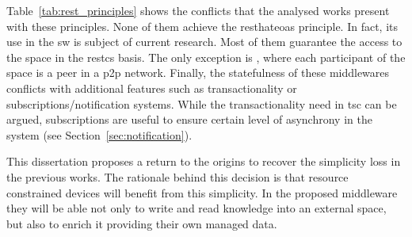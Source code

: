 Table~\ref{tab:rest_principles} shows the conflicts that the analysed works present with these principles.
None of them achieve the \ac{resthateoas} principle.
In fact, its use in the \ac{sw} is subject of current research.
Most of them guarantee the access to the space in the \ac{restcs} basis.
The only exception is \midtscpp{}, where each participant of the space is a peer in a \ac{p2p} network.
Finally, the statefulness of these middlewares conflicts with additional features such as transactionality or subscriptions/notification systems.
While the transactionality need in \ac{tsc} can be argued,
subscriptions are useful to ensure certain level of asynchrony in the system (see Section~\ref{sec:notification}).





This dissertation proposes a return to the origins to recover the simplicity loss in the previous works.
The rationale behind this decision is that resource constrained devices will benefit from this simplicity.
In the proposed middleware they will be able not only to write and read knowledge into an external space, but also to enrich it providing their own managed data.
